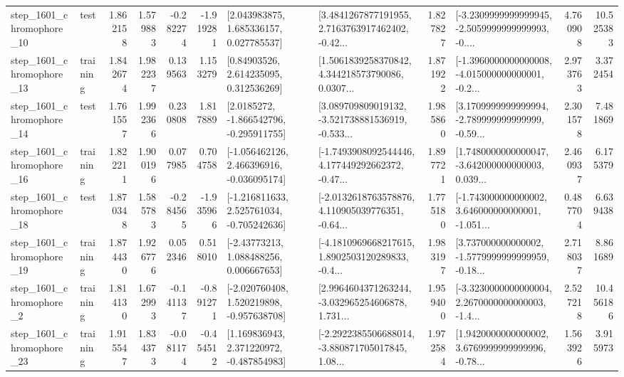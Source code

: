 \begin{tabular}{llrrrrllrlrr}
 step\_1601\_chromophore\_10 &      test &      1.862158 &    1.579883 &     -0.282274 & -1.919281 &     [2.043983875, 1.685336157, 0.027785537] &  [3.4841267877191955, 2.7163763917462402, -0.42... &       1.827827 &  [-3.2309999999999945, -2.5059999999999993, -0.... &            4.760908 &         10.525383 \\
 step\_1601\_chromophore\_13 &  training &      1.842674 &    1.982237 &      0.139563 &  1.153279 &      [0.84903526, 2.614235095, 0.312536269] &  [1.5061839258370842, 4.344218573790086, 0.0307... &       1.871922 &  [-1.3960000000000008, -4.015000000000001, -0.2... &            2.973763 &          3.372454 \\
 step\_1601\_chromophore\_14 &      test &      1.761557 &    1.992366 &      0.230808 &  1.817889 &     [2.0185272, -1.866542796, -0.295911755] &  [3.089709809019132, -3.521738881536919, -0.533... &       1.985860 &  [3.1709999999999994, -2.789999999999999, -0.59... &            2.301578 &          7.481869 \\
 step\_1601\_chromophore\_16 &  training &      1.822211 &    1.900196 &      0.077985 &  0.704758 &   [-1.056462126, 2.466396916, -0.036095174] &  [-1.7493908092544446, 4.177449292662372, -0.47... &       1.897721 &  [1.7480000000000047, -3.642000000000003, 0.039... &            2.460937 &          6.175379 \\
 step\_1601\_chromophore\_18 &      test &      1.870348 &    1.585783 &     -0.284565 & -1.935966 &   [-1.216811633, 2.525761034, -0.705242636] &  [-2.0132618763578876, 4.110905039776351, -0.64... &       1.775180 &  [-1.743000000000002, 3.646000000000001, -1.051... &            0.487704 &          6.639438 \\
 step\_1601\_chromophore\_19 &  training &      1.874430 &    1.926776 &      0.052346 &  0.518010 &     [-2.43773213, 1.088488256, 0.006667653] &  [-4.1810969668217615, 1.8902503120289833, -0.4... &       1.983197 &  [3.737000000000002, -1.5779999999999959, -0.18... &            2.718037 &          8.861689 \\
  step\_1601\_chromophore\_2 &  training &      1.814130 &    1.672993 &     -0.141137 & -0.891271 &   [-2.020760408, 1.520219898, -0.957638708] &  [2.9964604371263244, -3.032965254606878, 1.731... &       1.959400 &  [-3.3230000000000004, 2.2670000000000003, -1.4... &            2.527218 &         10.456186 \\
 step\_1601\_chromophore\_23 &  training &      1.915547 &    1.834373 &     -0.081174 & -0.454512 &    [1.169836943, 2.371220972, -0.487854983] &  [-2.2922385506688014, -3.880871705017845, 1.08... &       1.972584 &  [1.9420000000000002, 3.6769999999999996, -0.78... &            1.563926 &          3.915973 \\

\end{tabular}
